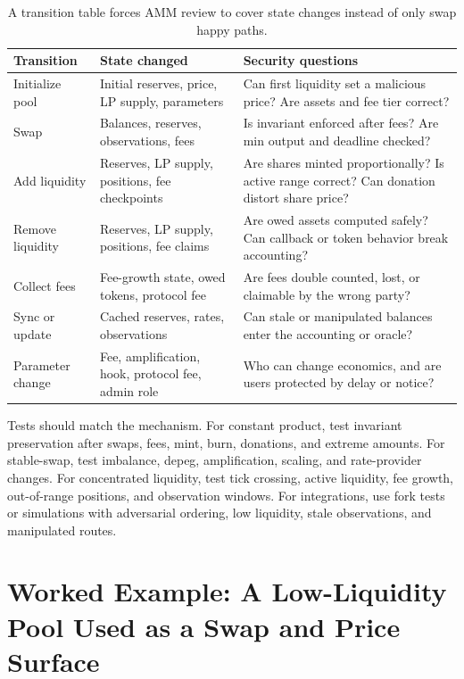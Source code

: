 \begin{table}[htbp]
\centering
\small
\renewcommand{\arraystretch}{1.16}
\begin{tabularx}{\textwidth}{@{}>{\RaggedRight\arraybackslash}p{}>{\RaggedRight\arraybackslash}p{}>{\RaggedRight\arraybackslash}X@{}}
\toprule
Transition & State changed & Security questions \\
\midrule
Initialize pool & Initial reserves, price, LP supply, parameters & Can first liquidity set a malicious price? Are assets and fee tier correct? \\
Swap & Balances, reserves, observations, fees & Is invariant enforced after fees? Are min output and deadline checked? \\
Add liquidity & Reserves, LP supply, positions, fee checkpoints & Are shares minted proportionally? Is active range correct? Can donation distort share price? \\
Remove liquidity & Reserves, LP supply, positions, fee claims & Are owed assets computed safely? Can callback or token behavior break accounting? \\
Collect fees & Fee-growth state, owed tokens, protocol fee & Are fees double counted, lost, or claimable by the wrong party? \\
Sync or update & Cached reserves, rates, observations & Can stale or manipulated balances enter the accounting or oracle? \\
Parameter change & Fee, amplification, hook, protocol fee, admin role & Who can change economics, and are users protected by delay or notice? \\
\bottomrule
\end{tabularx}
\caption{A transition table forces AMM review to cover state changes instead of only swap happy paths.}
\end{table}

Tests should match the mechanism. For constant product, test invariant preservation after swaps, fees, mint, burn, donations, and extreme amounts. For stable-swap, test imbalance, depeg, amplification, scaling, and rate-provider changes. For concentrated liquidity, test tick crossing, active liquidity, fee growth, out-of-range positions, and observation windows. For integrations, use fork tests or simulations with adversarial ordering, low liquidity, stale observations, and manipulated routes.

\section{Worked Example: A Low-Liquidity Pool Used as a Swap and Price Surface}

